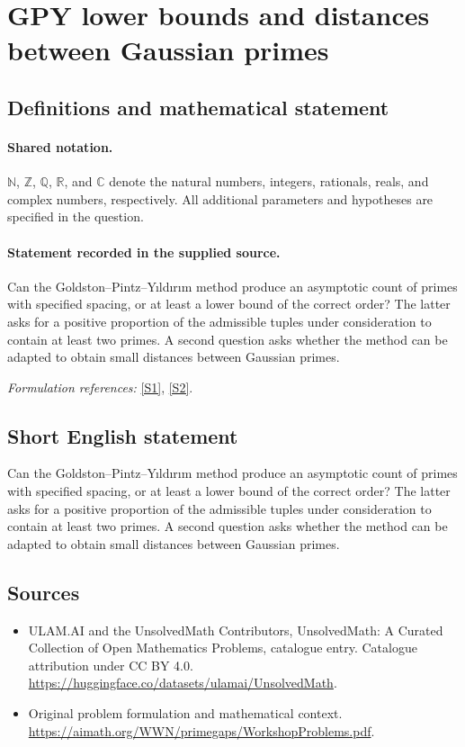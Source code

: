 \documentclass[11pt]{article}
\newcommand{\sref}[2]{\hyperlink{source:#1:#2}{[S#2]}}
\begin{document}
\section{GPY lower bounds and distances between Gaussian primes}\label{statement}

\subsection{Definitions and mathematical statement}

\paragraph{Shared notation.}$\mathbb N$, $\mathbb Z$, $\mathbb Q$, $\mathbb R$, and $\mathbb C$ denote the natural numbers, integers, rationals, reals, and complex numbers, respectively. All additional parameters and hypotheses are specified in the question.


\paragraph{Statement recorded in the supplied source.}
Can the Goldston--Pintz--Y\i ld\i r\i m method produce an asymptotic count of primes with specified spacing, or at least a lower bound of the correct order? The latter asks for a positive proportion of the admissible tuples under consideration to contain at least two primes. A second question asks whether the method can be adapted to obtain small distances between Gaussian primes.
\par\smallskip\textit{Formulation references:} \sref{statement}{1}, \sref{statement}{2}.
\subsection{Short English statement}
Can the Goldston--Pintz--Y\i ld\i r\i m method produce an asymptotic count of primes with specified spacing, or at least a lower bound of the correct order? The latter asks for a positive proportion of the admissible tuples under consideration to contain at least two primes. A second question asks whether the method can be adapted to obtain small distances between Gaussian primes.
\subsection{Sources}
\begin{itemize}
\item[\hypertarget{source:statement:1}{S1}] ULAM.AI and the UnsolvedMath Contributors, UnsolvedMath: A Curated Collection of Open Mathematics Problems, catalogue entry. Catalogue attribution under CC BY 4.0.
\url{https://huggingface.co/datasets/ulamai/UnsolvedMath}.
\item[\hypertarget{source:statement:2}{S2}] Original problem formulation and mathematical context.
\url{https://aimath.org/WWN/primegaps/WorkshopProblems.pdf}.
\end{itemize}
\label{end:statement}
\end{document}

